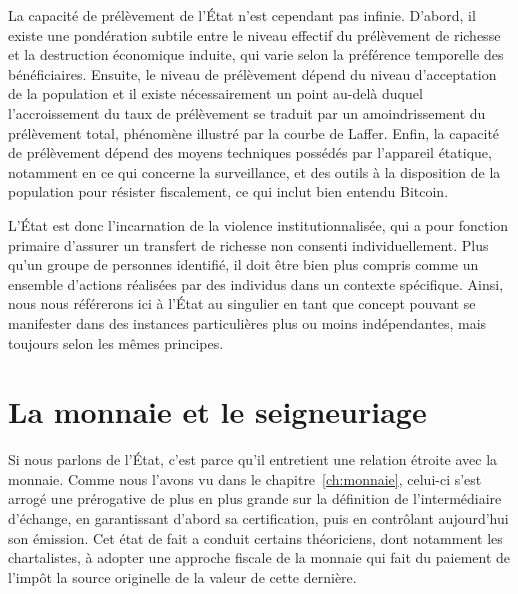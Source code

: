 La capacité de prélèvement de l'État n'est cependant pas infinie. D'abord, il existe une pondération subtile entre le niveau effectif du prélèvement de richesse et la destruction économique induite, qui varie selon la préférence temporelle des bénéficiaires. Ensuite, le niveau de prélèvement dépend du niveau d'acceptation de la population et il existe nécessairement un point au-delà duquel l'accroissement du taux de prélèvement se traduit par un amoindrissement du prélèvement total, phénomène illustré par la courbe de Laffer. Enfin, la capacité de prélèvement dépend des moyens techniques possédés par l'appareil étatique, notamment en ce qui concerne la surveillance, et des outils à la disposition de la population pour résister fiscalement, ce qui inclut bien entendu Bitcoin.

L'État est donc l'incarnation de la violence institutionnalisée, qui a pour fonction primaire d'assurer un transfert de richesse non consenti individuellement. Plus qu'un groupe de personnes identifié, il doit être bien plus compris comme un ensemble d'actions réalisées par des individus dans un contexte spécifique. Ainsi, nous nous référerons ici à l'État au singulier en tant que concept pouvant se manifester dans des instances particulières plus ou moins indépendantes, mais toujours selon les mêmes principes. %

\section*{La monnaie et le seigneuriage}

Si nous parlons de l'État, c'est parce qu'il entretient une relation étroite avec la monnaie. Comme nous l'avons vu dans le chapitre~\ref{ch:monnaie}, celui-ci s'est arrogé une prérogative de plus en plus grande sur la définition de l'intermédiaire d'échange, en garantissant d'abord sa certification, puis en contrôlant aujourd'hui son émission. Cet état de fait a conduit certains théoriciens, dont notamment les chartalistes, à adopter une approche fiscale de la monnaie qui fait du paiement de l'impôt la source originelle de la valeur de cette dernière.

